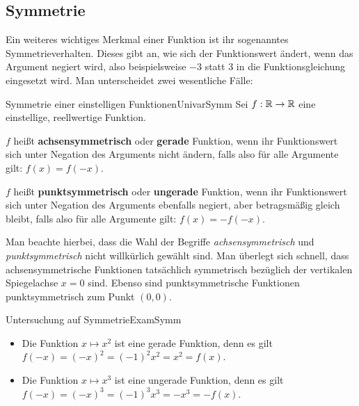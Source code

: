 \subsection{Symmetrie}

Ein weiteres wichtiges Merkmal einer Funktion ist ihr sogenanntes Symmetrieverhalten. Dieses gibt an, wie sich der Funktionswert ändert, wenn das Argument negiert wird, also beispielsweise $-3$ statt $3$ in die Funktionsgleichung eingesetzt wird. Man unterscheidet zwei wesentliche Fälle:

\begin{definition}{Symmetrie einer einstelligen Funktionen}{UnivarSymm}
    Sei $f: \mathbb{R} \to \mathbb{R}$ eine einstellige, reellwertige Funktion.

    $f$ heißt \textbf{achsensymmetrisch} oder \textbf{gerade} Funktion, wenn ihr Funktionswert sich unter Negation des Arguments nicht ändern, falls also für alle Argumente gilt: $f(x) = f(-x)$.

    $f$ heißt \textbf{punktsymmetrisch} oder \textbf{ungerade} Funktion, wenn ihr Funktionswert sich unter Negation des Arguments ebenfalls negiert, aber betragsmäßig gleich bleibt, falls also für alle Argumente gilt: $f(x) = -f(-x)$.
\end{definition}

Man beachte hierbei, dass die Wahl der Begriffe \emph{achsensymmetrisch} und \emph{punktsymmetrisch} nicht willkürlich gewählt sind. Man überlegt sich schnell, dass achsensymmetrische Funktionen tatsächlich symmetrisch bezüglich der vertikalen Spiegelachse $x=0$ sind. Ebenso sind punktsymmetrische Funktionen punktsymmetrisch zum Punkt $(0,0)$.

\begin{example}{Untersuchung auf Symmetrie}{ExamSymm}
    \begin{itemize}
        \item Die Funktion $x \mapsto x^2$ ist eine gerade Funktion, denn es gilt $f(-x) = (-x)^2 = (-1)^2 x^2 = x^2 = f(x)$.
        \item Die Funktion $x \mapsto x^3$ ist eine ungerade Funktion, denn es gilt $f(-x) = (-x)^3 = (-1)^3 x^3 = -x^3 = -f(x)$.
    \end{itemize}
\end{example}

